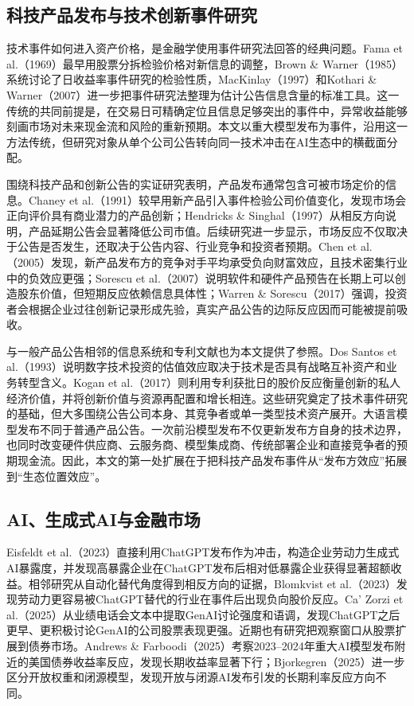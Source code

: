 \documentclass[11pt,fontset=fandol,a4paper]{ctexart}
\begin{document}
\subsection{科技产品发布与技术创新事件研究}

技术事件如何进入资产价格，是金融学使用事件研究法回答的经典问题。Fama et al.（1969）最早用股票分拆检验价格对新信息的调整，Brown \& Warner（1985）系统讨论了日收益率事件研究的检验性质，MacKinlay（1997）和Kothari \& Warner（2007）进一步把事件研究法整理为估计公告信息含量的标准工具。这一传统的共同前提是，在交易日可精确定位且信息足够突出的事件中，异常收益能够刻画市场对未来现金流和风险的重新预期。本文以重大模型发布为事件，沿用这一方法传统，但研究对象从单个公司公告转向同一技术冲击在AI生态中的横截面分配。

围绕科技产品和创新公告的实证研究表明，产品发布通常包含可被市场定价的信息。Chaney et al.（1991）较早用新产品引入事件检验公司价值变化，发现市场会正向评价具有商业潜力的产品创新；Hendricks \& Singhal（1997）从相反方向说明，产品延期公告会显著降低公司市值。后续研究进一步显示，市场反应不仅取决于公告是否发生，还取决于公告内容、行业竞争和投资者预期。Chen et al.（2005）发现，新产品发布方的竞争对手平均承受负向财富效应，且技术密集行业中的负效应更强；Sorescu et al.（2007）说明软件和硬件产品预告在长期上可以创造股东价值，但短期反应依赖信息具体性；Warren \& Sorescu（2017）强调，投资者会根据企业过往创新记录形成先验，真实产品公告的边际反应因而可能被提前吸收。

与一般产品公告相邻的信息系统和专利文献也为本文提供了参照。Dos Santos et al.（1993）说明数字技术投资的估值效应取决于技术是否具有战略互补资产和业务转型含义。Kogan et al.（2017）则利用专利获批日的股价反应衡量创新的私人经济价值，并将创新价值与资源再配置和增长相连。这些研究奠定了技术事件研究的基础，但大多围绕公告公司本身、其竞争者或单一类型技术资产展开。大语言模型发布不同于普通产品公告。一次前沿模型发布不仅更新发布方自身的技术边界，也同时改变硬件供应商、云服务商、模型集成商、传统部署企业和直接竞争者的预期现金流。因此，本文的第一处扩展在于把科技产品发布事件从“发布方效应”拓展到“生态位置效应”。

\subsection{AI、生成式AI与金融市场}

Eisfeldt et al.（2023）直接利用ChatGPT发布作为冲击，构造企业劳动力生成式AI暴露度，并发现高暴露企业在ChatGPT发布后相对低暴露企业获得显著超额收益。相邻研究从自动化替代角度得到相反方向的证据，Blomkvist et al.（2023）发现劳动力更容易被ChatGPT替代的行业在事件后出现负向股价反应。Ca' Zorzi et al.（2025）从业绩电话会文本中提取GenAI讨论强度和语调，发现ChatGPT之后更早、更积极讨论GenAI的公司股票表现更强。近期也有研究把观察窗口从股票扩展到债券市场。Andrews \& Farboodi（2025）考察2023--2024年重大AI模型发布附近的美国债券收益率反应，发现长期收益率显著下行；Bjorkegren（2025）进一步区分开放权重和闭源模型，发现开放与闭源AI发布引发的长期利率反应方向不同。
\end{document}
